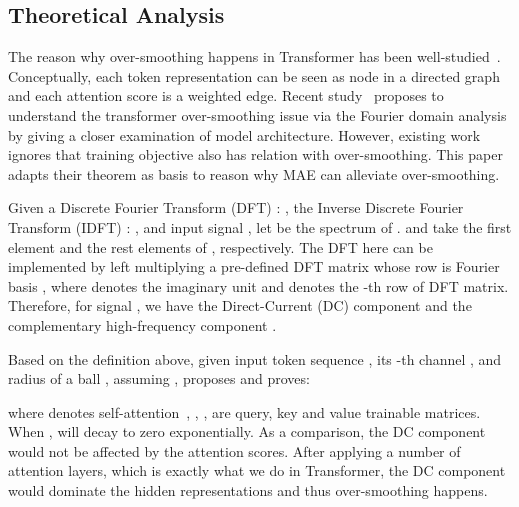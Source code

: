 \documentclass{article}
\theoremstyle{plain}
\theoremstyle{definition}
\theoremstyle{remark}
\begin{document}
\subsection{Theoretical Analysis}\label{sec: theoretical reasoning}


The reason why over-smoothing happens in Transformer has been well-studied~\citep{dong2021attention, wang2022anti}. Conceptually, each token representation can be seen as node in a directed graph and each attention score is a weighted edge. Recent study~\citep{wang2022anti} proposes to understand the transformer over-smoothing issue via the Fourier domain analysis by giving a closer examination of model architecture. However, existing work ignores that training objective also has relation with over-smoothing. This paper adapts their theorem as basis to reason why MAE can alleviate over-smoothing.



Given a Discrete Fourier Transform (DFT) : , the Inverse Discrete Fourier Transform (IDFT) : , and input signal , let  be the spectrum of .
 and  take the first element and the rest elements of , respectively. 
The DFT here can be implemented by left multiplying a pre-defined DFT matrix whose  row is Fourier basis , where  denotes the imaginary unit and  denotes the -th row of DFT matrix. 
Therefore, for signal , we have the Direct-Current (DC) component  and the complementary high-frequency component .

Based on the definition above, given input token sequence , its -th channel , and radius of a ball , assuming , \citet{wang2022anti} proposes and proves:





where  denotes self-attention~\citep{vaswani2017attention}, , ,  are query, key and value trainable matrices. When ,  will decay to zero exponentially. As a comparison, the DC component would not be affected by the attention scores. After applying a number of attention layers, which is exactly what we do in Transformer, the DC component would dominate the hidden representations and thus over-smoothing happens.
\end{document}
